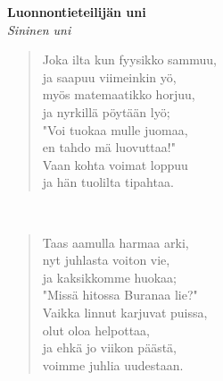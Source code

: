 %
%
\noindent\begin{minipage}{\linewidth}
\vspace{5pt}
\parbox[t]{0.85\linewidth}{\raggedright {\large\bf Luonnontieteilijän uni}\\[2pt]\small\emph{Sininen uni}\\[6pt]}
\begin{verse}
	
	Joka ilta kun fyysikko sammuu,\\
	ja saapuu viimeinkin yö,\\
	myös matemaatikko horjuu,\\
	ja nyrkillä pöytään lyö;\\
	"Voi tuokaa mulle juomaa,\\
	en tahdo mä luovuttaa!"\\
	Vaan kohta voimat loppuu\\
	ja hän tuolilta tipahtaa.\\
\end{verse}
\end{minipage}\\[10pt]
\noindent\begin{minipage}{\linewidth}
\begin{verse}
	Taas aamulla harmaa arki,\\
	nyt juhlasta voiton vie,\\
	ja kaksikkomme huokaa;\\
	"Missä hitossa Buranaa lie?"\\
	Vaikka linnut karjuvat puissa,\\
	olut oloa helpottaa,\\
	ja ehkä jo viikon päästä,\\
	voimme juhlia uudestaan.\\
\end{verse}
\end{minipage}\\[10pt]
%
%
